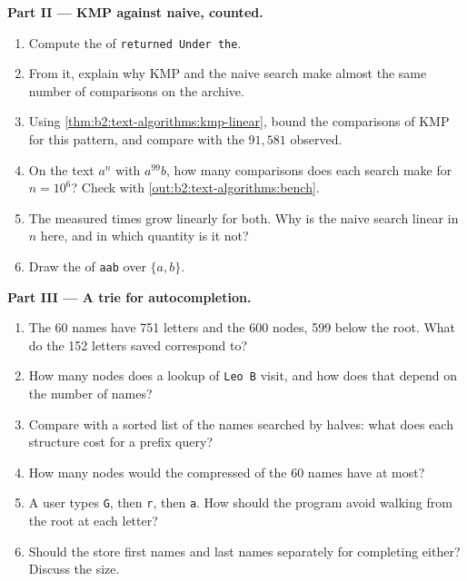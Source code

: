 \begin{problem}
\medskip\noindent\textbf{Part II --- KMP against naive, counted.}\par\nopagebreak
\begin{enumerate}[resume, beginpenalty=10000]
\item Compute the  of \texttt{returned Under the}.
\item From it, explain why KMP and the naive search make almost the same number of comparisons on the archive.
\item Using \cref{thm:b2:text-algorithms:kmp-linear}, bound the comparisons of KMP for this pattern, and compare with the
$91{,}581$ observed.
\item On the text $a^n$ with $a^{99}b$, how many comparisons does each search make for $n = 10^6$? Check with
\cref{out:b2:text-algorithms:bench}.
\item The measured times grow linearly for both. Why is the naive search linear in $n$ here, and in which quantity is it
not?
\item Draw the  of \texttt{aab} over $\{a, b\}$.
\end{enumerate}

\medskip\noindent\textbf{Part III --- A trie for autocompletion.}\par\nopagebreak
\begin{enumerate}[resume, beginpenalty=10000]
\item The 60 names have 751 letters and the  600 nodes, 599 below the root. What do the 152 letters saved correspond to?
\item How many nodes does a lookup of \texttt{Leo B} visit, and how does that depend on the number of names?
\item Compare with a sorted list of the names searched by halves: what does each structure cost for a prefix query?
\item How many nodes would the compressed  of the 60 names have at most?
\item A user types \texttt{G}, then \texttt{r}, then \texttt{a}. How should the program avoid walking from the root at
each letter?
\item Should the  store first names and last names separately for completing either? Discuss the size.
\end{enumerate}


\end{problem}
